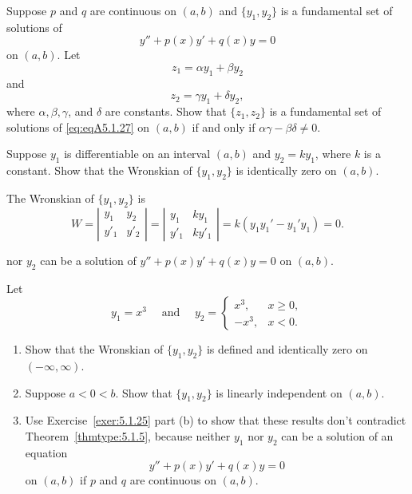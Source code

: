 \documentclass{ximera}
\begin{document}
\begin{problem}\label{exer:5.1.27}
Suppose $p$ and $q$ are continuous on  $(a,b)$ and
$\{y_1,y_2\}$ is a fundamental set of solutions of
\begin{equation}\label{eq:eqA5.1.27}
y''+p(x)y'+q(x)y=0
\end{equation}
on $(a,b)$. Let
$$
z_1=\alpha y_1+\beta y_2$$
and 
$$z_2=\gamma y_1+\delta
y_2,
$$
where $\alpha,\beta,\gamma$, and $\delta$ are constants.
 Show that  $\{z_1,z_2\}$ is a fundamental set of solutions
of \ref{eq:eqA5.1.27} on $(a,b)$ if and only if
$ \alpha\gamma-\beta\delta\ne0$.
\end{problem}

\begin{problem}\label{exer:5.1.28}
Suppose $y_1$ is differentiable on an interval  $(a,b)$
and $y_2=ky_1$, where $k$ is a constant. Show that the Wronskian of
$\{y_1,y_2\}$ is identically zero on  $(a,b)$.

\begin{solution}
    The Wronskian of  $\{y_1,y_2\}$ is
$$
W=\left| \begin{array}{cc}
y_1 & y_2 \\
y'_1 & y'_2
\end{array} \right|=
\left| \begin{array}{cc}
y_1 & ky_1 \\
y'_1 & ky'_1
\end{array} \right|=k(y_1y_1'-y_1'y_1)=0.
$$

nor $y_2$ can be a solution of $y''+p(x)y'+q(x)y=0$ on  $(a,b)$.
\end{solution}
\end{problem}

\begin{problem}\label{exer:5.1.29}
Let
$$
y_1=x^3\quad\mbox{ and }\quad y_2=\left\{\begin{array}{rl}
x^3,&x\ge 0,\\ -x^3,&x<0.\end{array}\right.
$$
\begin{enumerate}
\item %
Show that the Wronskian of $\{y_1,y_2\}$ is defined and identically
zero on
$(-\infty,\infty)$.
\item %
Suppose $a<0<b$.
Show that $\{y_1,y_2\}$ is linearly independent on  $(a,b)$.
\item %
Use Exercise~\ref{exer:5.1.25} part (b) to show that these results don't
contradict Theorem~\ref{thmtype:5.1.5}, because neither $y_1$ nor $y_2$
can be a solution of an equation
$$
y''+p(x)y'+q(x)y=0
$$
on  $(a,b)$ if $p$ and $q$ are continuous on  $(a,b)$.
\end{enumerate}
\end{problem}
\end{document}
